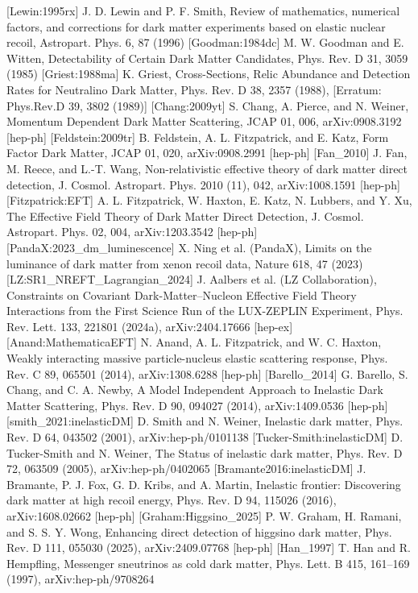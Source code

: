 [Lewin:1995rx] J. D. Lewin and P. F. Smith, Review of mathematics, numerical factors, and corrections for dark matter experiments based on elastic nuclear recoil, Astropart. Phys. 6, 87 (1996)
[Goodman:1984dc] M. W. Goodman and E. Witten, Detectability of Certain Dark Matter Candidates, Phys. Rev. D 31, 3059 (1985)
[Griest:1988ma] K. Griest, Cross-Sections, Relic Abundance and Detection Rates for Neutralino Dark Matter, Phys. Rev. D 38, 2357 (1988), [Erratum: Phys.Rev.D 39, 3802 (1989)]
[Chang:2009yt] S. Chang, A. Pierce, and N. Weiner, Momentum Dependent Dark Matter Scattering, JCAP 01, 006, arXiv:0908.3192 [hep-ph]
[Feldstein:2009tr] B. Feldstein, A. L. Fitzpatrick, and E. Katz, Form Factor Dark Matter, JCAP 01, 020, arXiv:0908.2991 [hep-ph]
[Fan_2010] J. Fan, M. Reece, and L.-T. Wang, Non-relativistic effective theory of dark matter direct detection, J. Cosmol. Astropart. Phys. 2010 (11), 042, arXiv:1008.1591 [hep-ph]
[Fitzpatrick:EFT] A. L. Fitzpatrick, W. Haxton, E. Katz, N. Lubbers, and Y. Xu, The Effective Field Theory of Dark Matter Direct Detection, J. Cosmol. Astropart. Phys. 02, 004, arXiv:1203.3542 [hep-ph]
[PandaX:2023_dm_luminescence] X. Ning et al. (PandaX), Limits on the luminance of dark matter from xenon recoil data, Nature 618, 47 (2023)
[LZ:SR1_NREFT_Lagrangian_2024] J. Aalbers et al. (LZ Collaboration), Constraints on Covariant Dark-Matter--Nucleon Effective Field Theory Interactions from the First Science Run of the LUX-ZEPLIN Experiment, Phys. Rev. Lett. 133, 221801 (2024a), arXiv:2404.17666 [hep-ex]
[Anand:MathematicaEFT] N. Anand, A. L. Fitzpatrick, and W. C. Haxton, Weakly interacting massive particle-nucleus elastic scattering response, Phys. Rev. C 89, 065501 (2014), arXiv:1308.6288 [hep-ph]
[Barello_2014] G. Barello, S. Chang, and C. A. Newby, A Model Independent Approach to Inelastic Dark Matter Scattering, Phys. Rev. D 90, 094027 (2014), arXiv:1409.0536 [hep-ph]
[smith_2021:inelasticDM] D. Smith and N. Weiner, Inelastic dark matter, Phys. Rev. D 64, 043502 (2001), arXiv:hep-ph/0101138
[Tucker-Smith:inelasticDM] D. Tucker-Smith and N. Weiner, The Status of inelastic dark matter, Phys. Rev. D 72, 063509 (2005), arXiv:hep-ph/0402065
[Bramante2016:inelasticDM] J. Bramante, P. J. Fox, G. D. Kribs, and A. Martin, Inelastic frontier: Discovering dark matter at high recoil energy, Phys. Rev. D 94, 115026 (2016), arXiv:1608.02662 [hep-ph]
[Graham:Higgsino_2025] P. W. Graham, H. Ramani, and S. S. Y. Wong, Enhancing direct detection of higgsino dark matter, Phys. Rev. D 111, 055030 (2025), arXiv:2409.07768 [hep-ph]
[Han_1997] T. Han and R. Hempfling, Messenger sneutrinos as cold dark matter, Phys. Lett. B 415, 161–169 (1997), arXiv:hep-ph/9708264
